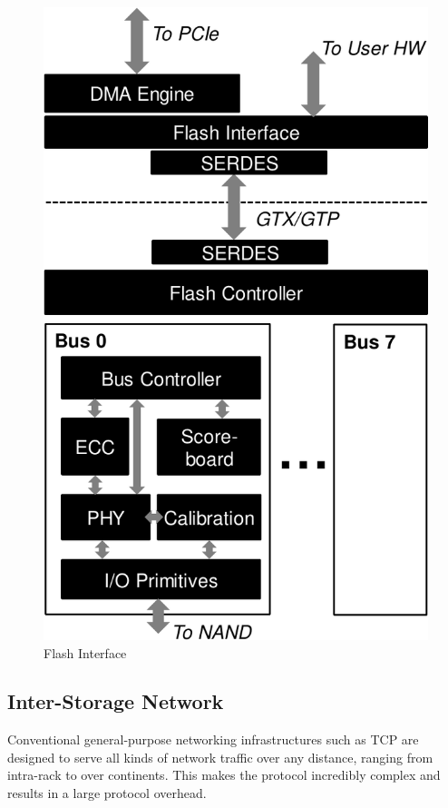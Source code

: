 \begin{figure}[h]
	\begin{center}
	\includegraphics[scale=0.4]{figures/top-arch-crop.pdf}
	\caption{Flash Interface}
	\label{fig:flashinterface}
	\end{center}
\end{figure}

\subsection{Inter-Storage Network}

Conventional general-purpose networking infrastructures such as TCP are designed to serve
all kinds of network traffic over any distance, ranging from intra-rack to over
continents. This makes the protocol incredibly complex and results in a large
protocol overhead.

